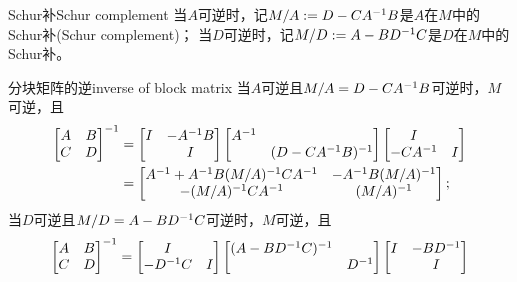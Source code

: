 \begin{definition}
	{Schur补}{Schur complement}
	当$A$可逆时，记$M/A:=D-CA^{-1} B$是$A$在$M$中的Schur补(Schur complement)；
	当$D$可逆时，记$M/D:=A-BD^{-1} C$是$D$在$M$中的Schur补。
\end{definition}

\begin{theorem}
	{分块矩阵的逆}{inverse of block matrix}
	当$A$可逆且$M/A=D-CA^{-1} B$可逆时，$M$可逆，且
	\begin{subequations}
		\begin{align}
			\begin{bmatrix}
				A&B\\C&D
			\end{bmatrix}^{-1}&=\begin{bmatrix}
				I&-A^{-1} B\\ &I
			\end{bmatrix}\begin{bmatrix}
				A^{-1}\\ &(D-CA^{-1} B)^{-1}
			\end{bmatrix}\begin{bmatrix}
				I\\-CA^{-1}&I
			\end{bmatrix}\\
			\label{eqn:[AB;CD]-1=M/A}
			&=\begin{bmatrix}
				A^{-1}+A^{-1} B(M/A)^{-1} CA^{-1}&-A^{-1} B(M/A)^{-1}\\
				-(M/A)^{-1} CA^{-1}&(M/A)^{-1}
			\end{bmatrix};
		\end{align}
	\end{subequations}
	当$D$可逆且$M/D=A-BD^{-1} C$可逆时，$M$可逆，且
	\begin{subequations}
		\begin{align}
			\begin{bmatrix}
				A&B\\C&D
			\end{bmatrix}\iv&=\begin{bmatrix}
				I\\-D\iv C&I
			\end{bmatrix}\begin{bmatrix}
				(A-BD\iv C)\iv\\ &D\iv
			\end{bmatrix}\begin{bmatrix}
				I&-BD\iv\\ &I
			\end{bmatrix}\\
			\label{eqn:[AB;CD]-1=M/D}

\end{align}
\end{subequations}
\end{theorem}
